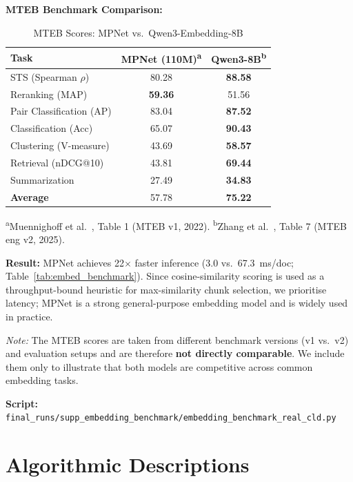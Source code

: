 \textbf{MTEB Benchmark Comparison:}

\begin{table}[H]
\centering
\caption{MTEB Scores: MPNet vs.\ Qwen3-Embedding-8B}
\label{tab:mteb_comparison}
\footnotesize
\begin{tabular}{@{}lcc@{}}
\toprule
\textbf{Task} & \textbf{MPNet (110M)\textsuperscript{a}} & \textbf{Qwen3-8B\textsuperscript{b}} \\
\midrule
STS (Spearman $\rho$) & 80.28 & \textbf{88.58} \\
Reranking (MAP) & \textbf{59.36} & 51.56 \\
Pair Classification (AP) & 83.04 & \textbf{87.52} \\
Classification (Acc) & 65.07 & \textbf{90.43} \\
Clustering (V-measure) & 43.69 & \textbf{58.57} \\
Retrieval (nDCG@10) & 43.81 & \textbf{69.44} \\
Summarization & 27.49 & \textbf{34.83} \\
\midrule
\textbf{Average} & 57.78 & \textbf{75.22} \\
\bottomrule
\end{tabular}

\vspace{0.3em}
\raggedright\scriptsize
\textsuperscript{a}Muennighoff et al.~\cite{muennighoff2023mteb}, Table 1 (MTEB v1, 2022). \textsuperscript{b}Zhang et al.~\cite{qwen3embedding2025}, Table 7 (MTEB eng v2, 2025).
\end{table}

\textbf{Result:} MPNet achieves 22$\times$ faster inference (3.0 vs.\ 67.3~ms/doc; Table~\ref{tab:embed_benchmark}). Since cosine-similarity scoring is used as a throughput-bound heuristic for max-similarity chunk selection, we prioritise latency; MPNet is a strong general-purpose embedding model and is widely used in practice.

\textit{Note:} The MTEB scores are taken from different benchmark versions (v1 vs.\ v2) and evaluation setups and are therefore \textbf{not directly comparable}. We include them only to illustrate that both models are competitive across common embedding tasks.

\textbf{Script:} \texttt{final\_runs/supp\_embedding\_benchmark/embedding\_benchmark\_real\_cld.py}

\chapter{Algorithmic Descriptions}
\label{sec:algorithms}

